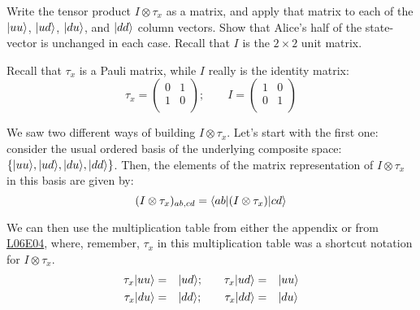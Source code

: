 \documentclass[solutions.tex]{subfiles}
\begin{document}
\maketitle
\begin{exercise} Write the tensor product $I\otimes\tau_x$ as
a matrix, and apply that matrix to each of the $|uu\rangle$, $|ud\rangle$,
$|du\rangle$, and $|dd\rangle$ column vectors. Show that Alice's half
of the state-vector is unchanged in each case. Recall that $I$ is the
$2\times2$ unit matrix.
\end{exercise}
Recall that $\tau_x$ is a Pauli matrix, while $I$ really is the
identity matrix:
\[
	\tau_x = \begin{pmatrix}
		0 & 1 \\
		1 & 0 \\
	\end{pmatrix};\qquad I=\begin{pmatrix}
		1 & 0 \\
		0 & 1 \\
	\end{pmatrix}
\]

We saw two different ways of building $I\otimes\tau_x$. Let's
start with the first one: consider the usual ordered basis of the
underlying composite space: $\{ |uu\rangle, |ud\rangle, |du\rangle, |dd\rangle \}$.
Then, the elements of the matrix representation of $I\otimes\tau_x$
in this basis are given by:
\[
	(I\otimes\tau_x)_{ab,cd} = \langle ab|(I\otimes\tau_x)|cd\rangle
\]

We can then use the multiplication table from either the appendix or from
\href{https://github.com/mbivert/ttm/blob/master/qm/L06E04.pdf}{L06E04},
where, remember, $\tau_x$ in this multiplication table was a shortcut
notation for $I\otimes\tau_x$.
\begin{equation*}\begin{aligned}
	\tau_x|uu\rangle &=&& |ud\rangle; &&&
	\tau_x|ud\rangle &=&& |uu\rangle \\
	\tau_x|du\rangle &=&& |dd\rangle; &&&
	\tau_x|dd\rangle &=&& |du\rangle \\
\end{aligned}\end{equation*}
\end{document}
